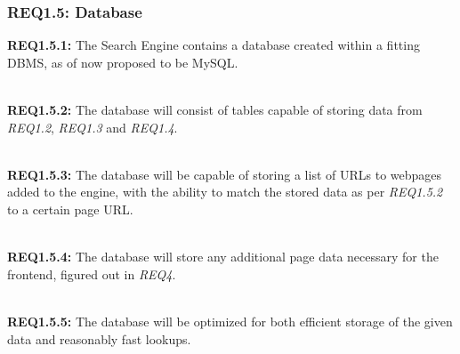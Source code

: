 \subsubsection{REQ1.5: Database}

\textbf{REQ1.5.1:} The Search Engine contains a database created within a fitting DBMS, as of now proposed to be MySQL.\par

\textbf{\\REQ1.5.2:} The database will consist of tables capable of storing data from \textit{REQ1.2}, \textit{REQ1.3} and \textit{REQ1.4}.\par

\textbf{\\REQ1.5.3:} The database will be capable of storing a list of URLs to webpages added to the engine, with the ability to match the stored data as per \textit{REQ1.5.2} to a certain page URL.\par

\textbf{\\REQ1.5.4:} The database will store any additional page data necessary for the frontend, figured out in \textit{REQ4}.\par

\textbf{\\REQ1.5.5:} The database will be optimized for both efficient storage of the given data and reasonably fast lookups.\par

